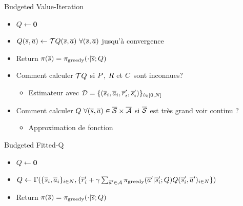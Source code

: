 \documentclass[french]{beamer}
\begin{document}
    \begin{frame}

        \begin{block}{Budgeted Value-Iteration}
            \begin{itemize}
                \item $Q \leftarrow \mathbf{0}$
                \item $Q(\os,\oa) \leftarrow \bo Q(\os,\oa)\ \forall (\os,\oa)$ jusqu'à convergence %
                \item Return $\pi(\overline{s}) = \pi_\text{greedy}(\cdot|\overline{s}; Q)$
            \end{itemize}
        \end{block}
        \pause
        \begin{alertblock}{}
            \begin{itemize}
                \item Comment calculer $\mathcal{T} Q$ si $P$, $R$ et $C$ sont inconnues?
                \begin{itemize}
                    \item Estimateur avec $\mathcal{D}=\{(\overline{s}_i,\overline{a}_i,\overline{r}_i',\overline{s}_i')\}_{i\in[0,N]}$
                \end{itemize}
                \item Comment calculer $Q\ \forall (\overline{s},\overline{a}) \in \overline{\mathcal{S}}\times\overline{\mathcal{A}}$ si $\overline{\mathcal{S}}$ est très grand voir continu ?
                \begin{itemize}
                    \item Approximation de fonction
                \end{itemize}
            \end{itemize}

        \end{alertblock}
        \pause
        \begin{block}{Budgeted Fitted-Q}
            \begin{itemize}
                \item $Q \leftarrow \mathbf{0}$
                \item $Q \leftarrow \Gamma(\{\overline{s}_{i},\overline{a}_{i}\}_{{i}\in N},\{\overline{r}'_{i} + \gamma \sum_{\overline{a}'\in \mathcal{A}} \pi_\text{greedy}(\overline{a}'|\overline{s}'_{i}; Q) Q(\overline{s}'_{i}, \overline{a}')_{{i} \in N}\})$
                \item Return $\pi(\overline{s}) = \pi_\text{greedy}(\cdot|\overline{s}; Q)$
            \end{itemize}
        \end{block}
    \end{frame}
\end{document}
